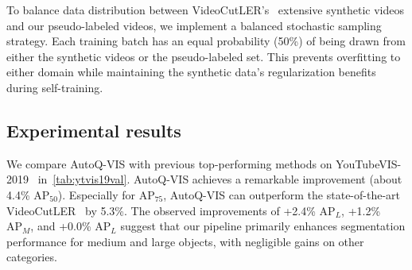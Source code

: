 To balance data distribution between VideoCutLER's~\cite{videocutler} extensive synthetic videos and our pseudo-labeled videos, we implement a balanced stochastic sampling strategy. Each training batch has an equal probability (50\%) of being drawn from either the synthetic videos or the pseudo-labeled set. This prevents overfitting to either domain while maintaining the synthetic data's regularization benefits during self-training. %


\subsection{Experimental results}



We compare AutoQ-VIS with previous top-performing methods on YouTubeVIS-2019~\cite{ytvis2019} in~\cref{tab:ytvis19val}. AutoQ-VIS achieves a remarkable improvement (about 4.4\% $\text{AP}_{50}$). Especially for $\text{AP}_{75}$, AutoQ-VIS can outperform the state-of-the-art VideoCutLER~\cite{videocutler} by 5.3\%. The observed improvements of +2.4\% $\text{AP}_{L}$, +1.2\% $\text{AP}_{M}$, and +0.0\% $\text{AP}_{L}$ suggest that our pipeline primarily enhances segmentation performance for medium and large objects, with negligible gains on other categories.



